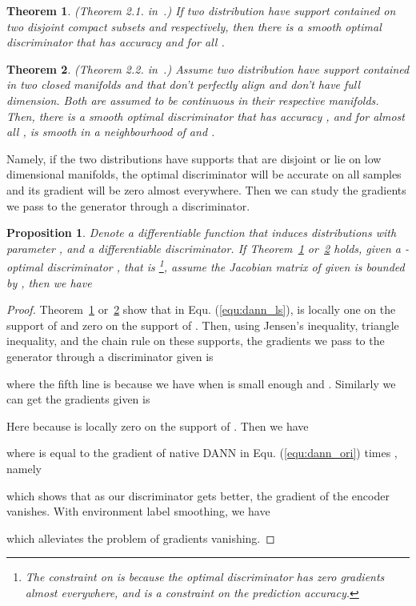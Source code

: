 \documentclass{article} \usepackage{iclr2023_conference,times}
\newtheorem{theo}{Theorem}
\newtheorem{prop}{Proposition}
\newcommand{\myref}[1]{Equ. (\ref{#1})}
\begin{document}
\begin{theo}
(Theorem 2.1. in~\citep{arjovsky2017towards}.) If two distribution  have support contained on two disjoint compact subsets  and  respectively, then there is a smooth optimal discriminator   that has accuracy  and  for all .
\label{theo:stable1}
\end{theo}


\begin{theo}
(Theorem 2.2. in~\citep{arjovsky2017towards}.) Assume two distribution  have support contained in two closed manifolds  and  that don’t perfectly align and don’t have full dimension. Both  are assumed to be  continuous in their respective manifolds. Then, there is a smooth optimal discriminator   that has accuracy , and for almost all ,  is smooth in a neighbourhood of  and .
\label{theo:stable2}
\end{theo}

Namely, if the two distributions have supports that are disjoint or lie on low dimensional manifolds, the optimal discriminator will be accurate on all samples and its gradient will be zero almost everywhere. Then we can study the gradients we pass to the generator through a discriminator. 

\begin{prop}
Denote  a differentiable function that induces distributions  with parameter , and  a differentiable discriminator. If Theorem~\ref{theo:stable1} or~\ref{theo:stable2} holds, given a -optimal discriminator , that is \footnote{The constraint on  is because the optimal discriminator has zero gradients almost everywhere, and  is a constraint on the prediction accuracy.}, assume the Jacobian matrix of  given  is bounded by , then we have 


\label{prop:stable}
\end{prop}
\begin{proof}
Theorem~\ref{theo:stable1} or~\ref{theo:stable2} show that in \myref{equ:dann_ls},  is locally one on the support of  and zero on the support of . Then, using Jensen’s inequality, triangle inequality, and the chain rule on these supports, the gradients we pass to the generator through a discriminator given  is

where the fifth line is because we have  when  is small enough and . Similarly we can get the gradients given  is

Here  because  is locally zero on the support of . Then we have 

where  is equal to the gradient of native DANN in \myref{equ:dann_ori} times , namely

which shows that as our discriminator gets better, the gradient of the encoder vanishes. With environment label smoothing, we have 

which alleviates the problem of gradients vanishing.
\end{proof}
\end{document}
